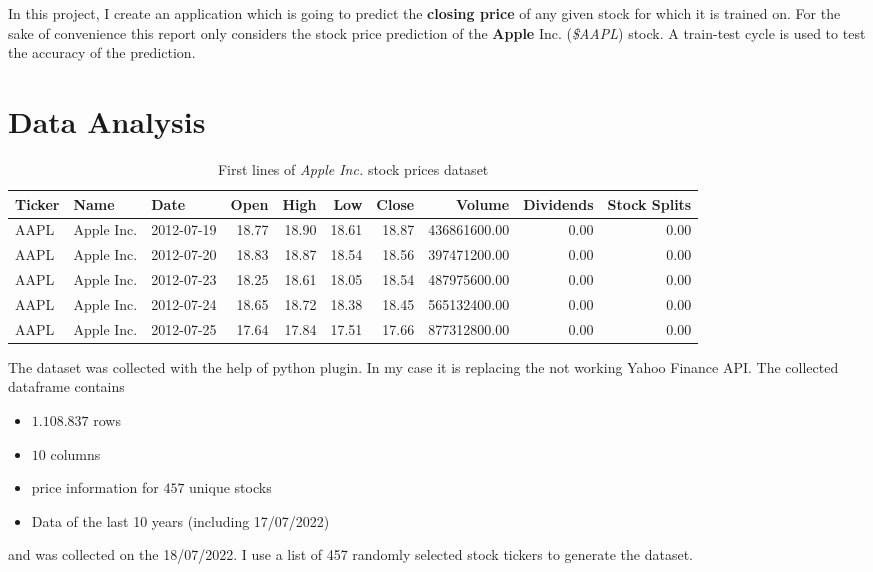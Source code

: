 \documentclass[fleqn,10pt]{SelfArx} %
\begin{document}
In this project, I create an application which is going to predict the \textbf{closing price} of any given stock for which it is trained on. For the sake of convenience this report only considers the stock price prediction of the \textbf{Apple} Inc. (\textit{\$AAPL}) stock. A train-test cycle is used to test the accuracy of the prediction.





\section{Data Analysis}

\begin{table*}[hbt]
	\caption{First lines of \textit{Apple Inc.} stock prices dataset}
	\centering
\begin{tabular}{lllrrrrrrr}
\toprule
Ticker &       Name &       Date &  Open &  High &   Low &  Close &       Volume &  Dividends &  Stock Splits \\
\midrule
  AAPL & Apple Inc. & 2012-07-19 & 18.77 & 18.90 & 18.61 &  18.87 & 436861600.00 &       0.00 &          0.00 \\
  AAPL & Apple Inc. & 2012-07-20 & 18.83 & 18.87 & 18.54 &  18.56 & 397471200.00 &       0.00 &          0.00 \\
  AAPL & Apple Inc. & 2012-07-23 & 18.25 & 18.61 & 18.05 &  18.54 & 487975600.00 &       0.00 &          0.00 \\
  AAPL & Apple Inc. & 2012-07-24 & 18.65 & 18.72 & 18.38 &  18.45 & 565132400.00 &       0.00 &          0.00 \\
  AAPL & Apple Inc. & 2012-07-25 & 17.64 & 17.84 & 17.51 &  17.66 & 877312800.00 &       0.00 &          0.00 \\
\bottomrule
\end{tabular}
	\label{tab:df.head}
\end{table*}

The dataset was collected with the help of  python plugin. In my case it is replacing the not working Yahoo Finance API. The collected dataframe contains
\begin{itemize}[noitemsep] %
	\item $1.108.837$ rows
	\item $10$ columns
	\item price information for $457$ unique stocks
	\item Data of the last 10 years (including 17/07/2022)
\end{itemize} and was collected on the 18/07/2022. I use a list of 457 randomly selected stock tickers to generate the dataset. 
\end{document}
